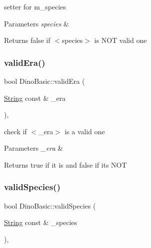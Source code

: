 setter for m\+\_\+species 
\begin{DoxyParams}{Parameters}
{\em species} & \\
\hline
\end{DoxyParams}
\begin{DoxyReturn}{Returns}
false if $<$species$>$ is N\+OT valid one 
\end{DoxyReturn}
\mbox{\label{classDinoBasic_ac76def9187ceb6c2546809c6a9cb0327}} 
\subsubsection{\texorpdfstring{valid\+Era()}{validEra()}}
{\footnotesize\ttfamily bool Dino\+Basic\+::valid\+Era (\begin{DoxyParamCaption}\item[{\hyperlink{classString}{String} const \&}]{\+\_\+era }\end{DoxyParamCaption})\hspace{0.3cm}{\ttfamily [static]}, {\ttfamily [private]}}

check if $<$\+\_\+era$>$ is a valid one 
\begin{DoxyParams}{Parameters}
{\em \+\_\+era} & \\
\hline
\end{DoxyParams}
\begin{DoxyReturn}{Returns}
true if it is and false if it\textquotesingle{}s N\+OT 
\end{DoxyReturn}
\mbox{\label{classDinoBasic_ac3b7303ce6b953511db08ae189fd42b7}} 
\subsubsection{\texorpdfstring{valid\+Species()}{validSpecies()}}
{\footnotesize\ttfamily bool Dino\+Basic\+::valid\+Species (\begin{DoxyParamCaption}\item[{\hyperlink{classString}{String} const \&}]{\+\_\+species }\end{DoxyParamCaption})\hspace{0.3cm}{\ttfamily [static]}, {\ttfamily [private]}}

